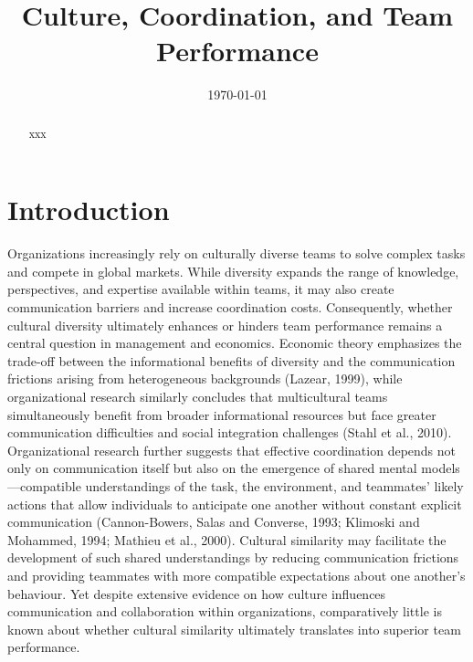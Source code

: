 \documentclass[10pt]{article}
\title{Culture, Coordination, and Team Performance}
\author{}
\date{\today}
\begin{document}
\maketitle
\thispagestyle{empty}

\begin{abstract}

xxx
\end{abstract}
\section{Introduction}
Organizations increasingly rely on culturally diverse teams to solve complex tasks and compete in global markets. While diversity expands the range of knowledge, perspectives, and expertise available within teams, it may also create communication barriers and increase coordination costs. Consequently, whether cultural diversity ultimately enhances or hinders team performance remains a central question in management and economics. Economic theory emphasizes the trade-off between the informational benefits of diversity and the communication frictions arising from heterogeneous backgrounds (Lazear, 1999), while organizational research similarly concludes that multicultural teams simultaneously benefit from broader informational resources but face greater communication difficulties and social integration challenges (Stahl et al., 2010). Organizational research further suggests that effective coordination depends not only on communication itself but also on the emergence of shared mental models—compatible understandings of the task, the environment, and teammates’ likely actions that allow individuals to anticipate one another without constant explicit communication (Cannon-Bowers, Salas and Converse, 1993; Klimoski and Mohammed, 1994; Mathieu et al., 2000). Cultural similarity may facilitate the development of such shared understandings by reducing communication frictions and providing teammates with more compatible expectations about one another’s behaviour. Yet despite extensive evidence on how culture influences communication and collaboration within organizations, comparatively little is known about whether cultural similarity ultimately translates into superior team performance.
\end{document}

